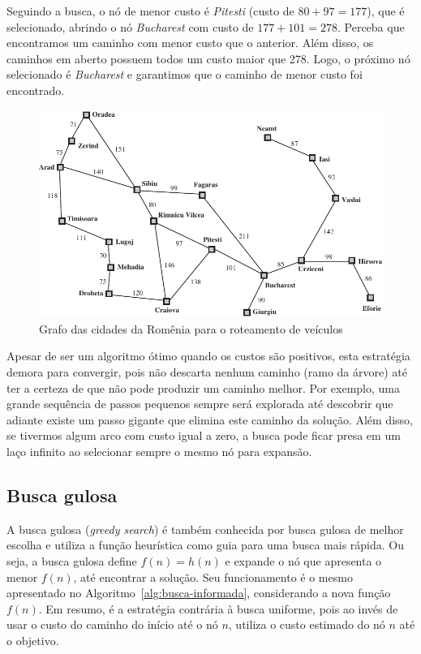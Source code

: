 Seguindo a busca, o nó de menor custo é \textit{Pitesti} (custo de $80 + 97 = 177$), que é selecionado, abrindo o nó \textit{Bucharest} com custo de $177 + 101 = 278$. Perceba que encontramos um caminho com menor custo que o anterior. Além disso, os caminhos em aberto possuem todos um custo maior que 278. Logo, o próximo nó selecionado é \textit{Bucharest} e garantimos que o caminho de menor custo foi encontrado.

\begin{figure}[h]
	\centering
	\includegraphics[width=\textwidth]{img/grafo-cidades-roteamento}
	\caption{Grafo das cidades da Romênia para o roteamento de veículos}
	\label{fig:grafo-cidades-roteamento-2}
\end{figure}

Apesar de ser um algoritmo ótimo quando os custos são positivos, esta estratégia demora para convergir, pois não descarta nenhum caminho (ramo da árvore) até ter a certeza de que não pode produzir um caminho melhor. Por exemplo, uma grande sequência de passos pequenos sempre será explorada até descobrir que adiante existe um passo gigante que elimina este caminho da solução. Além disso, se tivermos algum arco com custo igual a zero, a busca pode ficar presa em um laço infinito ao selecionar sempre o mesmo nó para expansão.

\subsection{Busca gulosa}

A busca gulosa (\textit{greedy search}) é também conhecida por busca gulosa de melhor escolha e utiliza a função heurística como guia para uma busca mais rápida. Ou seja, a busca gulosa define $f(n) = h(n)$ e expande o nó que apresenta o menor $f(n)$, até encontrar a solução. Seu funcionamento é o mesmo apresentado no Algoritmo~\ref{alg:busca-informada}, considerando a nova função $f(n)$. Em resumo, é a estratégia contrária à busca uniforme, pois ao invés de usar o custo do caminho do início até o nó $n$, utiliza o custo estimado do nó $n$ até o objetivo. 


